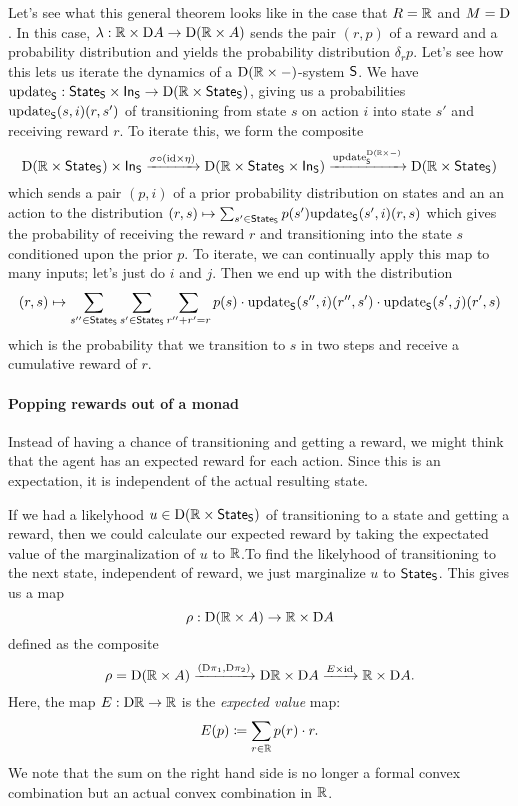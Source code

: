 \documentclass[DynamicalBook]{subfiles}
\begin{document}
\begin{example}
Let's see what this general theorem looks like in the case that $R = \mathbb{R}$ and $M
= \mathrm{D}$. In this case, $\lambda : \mathbb{R} \times \mathrm{D} A \to \mathrm{D} (\mathbb{R} \times A)$
sends the pair $(r, p)$ of a reward and a probability distribution and yields
the probability distribution $\delta_r p$.
Let's see how this lets us iterate the dynamics of a $\mathrm{D}(\mathbb{R}\times
-)$-system $\mathsf{S}$. We have $\mathrm{update}_{\mathsf{S}} : \mathsf{State}_{\mathsf{S}} \times \mathsf{In}_{\mathsf{S}} \to
\mathrm{D}(\mathbb{R} \times \mathsf{State}_{\mathsf{S}})$, giving us a probabilities
$\mathrm{update}_{\mathsf{S}}(s, i)(r, s')$ of transitioning from state $s$ on action $i$ into
state $s'$ and receiving reward $r$. To iterate this, we form the composite
$$\mathrm{D}(\mathbb{R} \times \mathsf{State}_{\mathsf{S}} ) \times \mathsf{In}_{\mathsf{S}}\xrightarrow{\sigma \circ (\mathrm{id} \times \eta)} 
\mathrm{D}(\mathbb{R} \times \mathsf{State}_{\mathsf{S}} \times \mathsf{In}_{\mathsf{S}}) \xrightarrow{\mathrm{update}_{\mathsf{S}}^{\mathrm{D}(\mathbb{R}
    \times -)}} \mathrm{D}(\mathbb{R} \times \mathsf{State}_{\mathsf{S}})$$
which sends a pair $(p, i)$ of a prior probability distribution on states and an
an action to the distribution $(r, s) \mapsto \sum_{s' \in \mathsf{State}_{\mathsf{S}}}p(s')
\mathrm{update}_{\mathsf{S}}(s', i)(r, s)$ which gives the probability of receiving the reward $r$
and transitioning into the state $s$ conditioned upon the prior $p$. To iterate,
we can continually apply this map to many inputs; let's just do $i$ and $j$. Then we end up
with the distribution
\[
(r, s) \mapsto \sum_{s'' \in \mathsf{State}_{\mathsf{S}}}\sum_{s' \in \mathsf{State}_{\mathsf{S}}}\sum_{r'' + r' = r}
p(s)\cdot\mathrm{update}_{\mathsf{S}}(s'', i)(r'', s')\cdot \mathrm{update}_{\mathsf{S}}(s', j)(r', s)
\]
which is the probability that we transition to $s$ in two steps and receive a
cumulative reward of $r$.
\end{example}


\iffalse
\paragraph{Popping rewards out of a monad}

Instead of having a chance of transitioning and getting a reward, we might think
that the agent has an expected reward for each action. Since this is an
expectation, it is independent of the actual resulting state.

If we had a likelyhood $u \in \mathrm{D}(\mathbb{R} \times \mathsf{State}_{\mathsf{S}})$ of transitioning
to a state and getting a reward, then we could calculate our expected reward by
taking the expectated value of the marginalization of $u$ to $\mathbb{R}$.To find the
likelyhood of transitioning to the next state, independent of reward, we just
marginalize $u$ to $\mathsf{State}_{\mathsf{S}}$. This gives
us a map
\[
\rho : \mathrm{D}(\mathbb{R} \times A) \to \mathbb{R} \times \mathrm{D} A
\]
defined as the composite 
\[
\rho = \mathrm{D}(\mathbb{R} \times A) \xrightarrow{(\mathrm{D} \pi_1, \mathrm{D} \pi_2)}
\mathrm{D} \mathbb{R} \times \mathrm{D} A \xrightarrow{E \times \mathrm{id}} \mathbb{R} \times \mathrm{D} A.
\]
Here, the map $E : \mathrm{D} \mathbb{R} \to \mathbb{R}$ is the \emph{expected value} map:
\[
E(p) \coloneqq \sum_{r \in \mathbb{R}} p(r) \cdot r.
\]
We note that the sum on the right hand side is no longer a formal convex
combination but an actual convex combination in $\mathbb{R}$.
\end{document}
